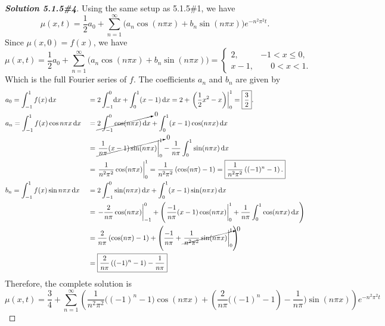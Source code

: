 \documentclass[letterpaper,11pt]{article} %
\theoremstyle{plain}
\begin{document}
\begin{proof}[\textbf{Solution 5.1.5\#4}] %
    Using the same setup as 5.1.5\#1, we have \begin{equation*}
    \mu(x,t) = \frac{1}{2} a_0 + \sum_{n=1}^\infty \Big( a_n \cos \left(n \pi x\right) + b_n \sin \left( n\pi x \right) \Big) e^{-n^2 \pi^2 t}.
    \end{equation*}
     Since $\mu(x, 0) = f(x)$, we have
    \begin{equation*}
    \mu(x,t) = \frac{1}{2} a_0 + \sum_{n=1}^\infty \Big( a_n \cos \left(n \pi x\right) + b_n \sin \left( n\pi x \right) \Big) = \begin{cases} 2, & -1 < x \leq 0, \\ x -1, & \phantom{-}0 < x < 1. \end{cases}
    \end{equation*}
    Which is the full Fourier series of $f$. The coefficients $a_n$ and $b_n$ are given by
    \begin{align*}
        &a_0 = \int_{-1}^1 f(x) \, \mathrm dx& &= 2\int_{-1}^0 \!\mathrm{d}x + \int_0^1 (x-1) \, \mathrm{d}x = 2 + \left.\left(\frac{1}{2}x^2 - x\right)\right|_0^1 = \boxed{\frac{3}{2}}. \\
        &a_n= \int_{-1}^1 f(x) \cos n \pi x \, \mathrm{d}x& &= \cancelto{0}{2 \int_{-1}^0 \cos(n\pi x)\,\mathrm{d}x} + \int_0^1 (x-1) \cos (n \pi x) \,\mathrm{d}x \\
        &&&= \cancelto{0}{\left.\frac{1}{n\pi}(x-1)\sin(n\pi x)\right|_0^1}  - \frac{1}{n\pi}\int_0^1 \sin(n \pi x) \, \mathrm dx \\
        &&& = \left.\frac{1}{n^2 \pi^2} \cos (n\pi x) \right|_0^1 = \frac{1}{n^2 \pi^2}\left(\cos (n \pi) - 1\right) = \boxed{\frac{1}{n^2 \pi^2} \left( (-1)^{n} - 1\right).}\\
        &b_n = \int_{-1}^1 f(x) \sin n \pi x \, \mathrm{d}x& &= 2 \int_{-1}^0 \sin(n\pi x)\,\mathrm{d}x + \int_0^1 (x-1) \sin (n \pi x) \,\mathrm{d}x \\
        &&& = \left.-\frac{2}{n \pi} \cos(n\pi x)\right|_{-1}^0 + \left(\left.\frac{-1}{n\pi}(x-1)\cos(n\pi x)\right|_0^1 + \frac{1}{n\pi}\int_0^1 \cos(n\pi x)\,\mathrm{d}x\right) \\
        &&&=\frac{2}{n\pi} \left(\cos(n\pi) -1 \right) + \left(\frac{-1}{n\pi} + \cancelto{0}{\left.\frac{1}{n^2 \pi^2} \sin(n\pi x) \right|_0^1}\right) \\
        &&&=\boxed{\frac{2}{n\pi}\left((-1)^n - 1\right) - \frac{1}{n\pi}}
    \end{align*}
    Therefore, the complete solution is
    \begin{equation*}
    \boxed{\mu(x,t) = \frac{3}{4} + \sum_{n=1}^\infty \left( \frac{1}{n^2 \pi^2} \Big( (-1)^{n} - 1\Big)\cos(n\pi x) + \left(\frac{2}{n\pi}\Big((-1)^n - 1\right) - \frac{1}{n\pi}\Big) \sin(n\pi x) \right)e^{-n^2 \pi^2 t}}
    \end{equation*}
\end{proof}
\end{document}
